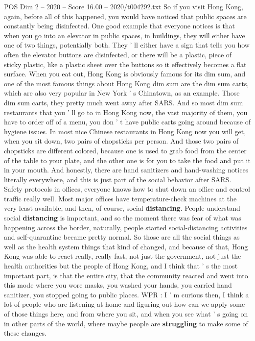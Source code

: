 \begin{textsample}{POS Dim 2 – 2020 – Score 16.00 – 2020/t004292.txt}
So if you visit Hong Kong, again, before all of this happened, you would have noticed that public spaces are constantly being disinfected.
One good example that everyone notices is that when you go into an elevator in public spaces, in buildings, they will either have one of two things, potentially both.
They ' ll either have a sign that tells you how often the elevator buttons are disinfected, or there will be a plastic, piece of sticky plastic, like a plastic sheet over the buttons so it effectively becomes a flat surface.
When you eat out, Hong Kong is obviously famous for its dim sum, and one of the most famous things about Hong Kong dim sum are the dim sum carts, which are also very popular in New York ' s Chinatown, as an example.
Those dim sum carts, they pretty much went away after SARS.
And so most dim sum restaurants that you ' ll go to in Hong Kong now, the vast majority of them, you have to order off of a menu, you don ' t have public carts going around because of hygiene issues.
In most nice Chinese restaurants in Hong Kong now you will get, when you sit down, two pairs of chopsticks per person.
And those two pairs of chopsticks are different colored, because one is used to grab food from the center of the table to your plate, and the other one is for you to take the food and put it in your mouth.
And honestly, there are hand sanitizers and hand-washing notices literally everywhere, and this is just part of the social behavior after SARS.
Safety protocols in offices, everyone knows how to shut down an office and control traffic really well.
Most major offices have temperature-check machines at the very least available, and then, of course, social \textbf{distancing}.
People understand social \textbf{distancing} is important, and so the moment there was fear of what was happening across the border, naturally, people started social-distancing activities and self-quarantine became pretty normal.
So those are all the social things as well as the health system things that kind of changed, and because of that, Hong Kong was able to react really, really fast, not just the government, not just the health authorities but the people of Hong Kong, and I think that ' s the most important part, is that the entire city, that the community reacted and went into this mode where you wore masks, you washed your hands, you carried hand sanitizer, you stopped going to public places.
WPR : I ' m curious then, I think a lot of people who are listening at home and figuring out how can we apply some of those things here, and from where you sit, and when you see what ' s going on in other parts of the world, where maybe people are \textbf{struggling} to make some of these changes.

\end{textsample}
